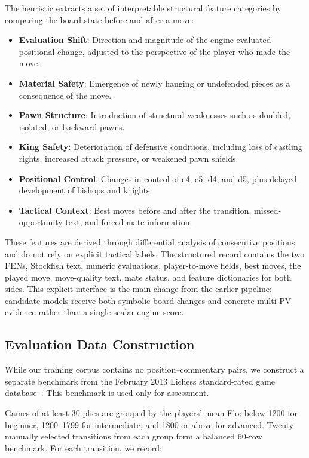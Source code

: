 \documentclass[sigconf,nonacm]{acmart}
\begin{document}
The heuristic extracts a set of interpretable structural feature categories by comparing the board state before and after a move:
\begin{itemize}
    \item \textbf{Evaluation Shift}: Direction and magnitude of the engine-evaluated positional change, adjusted to the perspective of the player who made the move.
    \item \textbf{Material Safety}: Emergence of newly hanging or undefended pieces as a consequence of the move.
    \item \textbf{Pawn Structure}: Introduction of structural weaknesses such as doubled, isolated, or backward pawns.
    \item \textbf{King Safety}: Deterioration of defensive conditions, including loss of castling rights, increased attack pressure, or weakened pawn shields.
    \item \textbf{Positional Control}: Changes in control of e4, e5, d4, and d5, plus delayed development of bishops and knights.
    \item \textbf{Tactical Context}: Best moves before and after the transition, missed-opportunity text, and forced-mate information.
\end{itemize}

These features are derived through differential analysis of consecutive positions and do not rely on explicit tactical labels. The structured record contains the two FENs, Stockfish text, numeric evaluations, player-to-move fields, best moves, the played move, move-quality text, mate status, and feature dictionaries for both sides. This explicit interface is the main change from the earlier pipeline: candidate models receive both symbolic board changes and concrete multi-PV evidence rather than a single scalar engine score.

\subsection{Evaluation Data Construction}
\label{subsec:eval-data}

While our training corpus contains no position--commentary pairs, we construct a separate benchmark from the February 2013 Lichess standard-rated game database~\cite{lichesselite}. This benchmark is used only for assessment.

Games of at least 30 plies are grouped by the players' mean Elo: below 1200 for beginner, 1200--1799 for intermediate, and 1800 or above for advanced. Twenty manually selected transitions from each group form a balanced 60-row benchmark. For each transition, we record:
\end{document}
